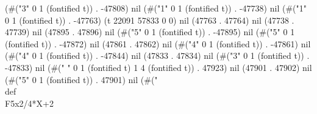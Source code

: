 (#("3" 0 1 (fontified t)) . -47808) nil (#("1" 0 1 (fontified t)) . -47738) nil (#("1" 0 1 (fontified t)) . -47763) (t 22091 57833 0 0) nil (47763 . 47764) nil (47738 . 47739) nil (47895 . 47896) nil (#("5" 0 1 (fontified t)) . -47895) nil (#("5" 0 1 (fontified t)) . -47872) nil (47861 . 47862) nil (#("4" 0 1 (fontified t)) . -47861) nil (#("4" 0 1 (fontified t)) . -47844) nil (47833 . 47834) nil (#("3" 0 1 (fontified t)) . -47833) nil (#("%
   " 0 1 (fontified t) 1 4 (fontified t)) . 47923) nil (47901 . 47902) nil (#("5" 0 1 (fontified t)) . 47901) nil (#("\\def\\F5x{2/4*X+2}
